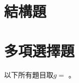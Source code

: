 \documentclass[class=exam, crop=false]{standalone}
\begin{document}
\setlength{\tabcolsep}{10pt}

\section*{結構題}
\begin{questions}
    \foreachproblem[lq]{
        \question \thisproblem \clearpage
    }
\end{questions}

\section*{多項選擇題}
以下所有題目取$g=$ 。
\begin{questions}
    \foreachproblem[mc]{
        \filbreak\question\thisproblem
    }
\end{questions}



\end{document}
